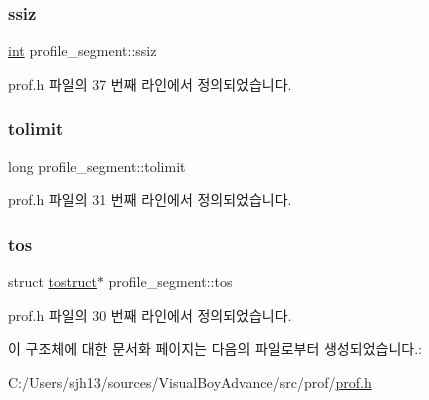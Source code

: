 \subsubsection{\texorpdfstring{ssiz}{ssiz}}
{\footnotesize\ttfamily \mbox{\hyperlink{_util_8cpp_a0ef32aa8672df19503a49fab2d0c8071}{int}} profile\+\_\+segment\+::ssiz}



prof.\+h 파일의 37 번째 라인에서 정의되었습니다.

\mbox{\label{structprofile__segment_ae05a2e4cec6f5e9b4d09617b1dd14154}} 
\subsubsection{\texorpdfstring{tolimit}{tolimit}}
{\footnotesize\ttfamily long profile\+\_\+segment\+::tolimit}



prof.\+h 파일의 31 번째 라인에서 정의되었습니다.

\mbox{\label{structprofile__segment_abef295486183253034168e0b10ab0145}} 
\subsubsection{\texorpdfstring{tos}{tos}}
{\footnotesize\ttfamily struct \mbox{\hyperlink{structtostruct}{tostruct}}$\ast$ profile\+\_\+segment\+::tos}



prof.\+h 파일의 30 번째 라인에서 정의되었습니다.



이 구조체에 대한 문서화 페이지는 다음의 파일로부터 생성되었습니다.\+:\begin{DoxyCompactItemize}
\item 
C\+:/\+Users/sjh13/sources/\+Visual\+Boy\+Advance/src/prof/\mbox{\hyperlink{prof_8h}{prof.\+h}}\end{DoxyCompactItemize}
